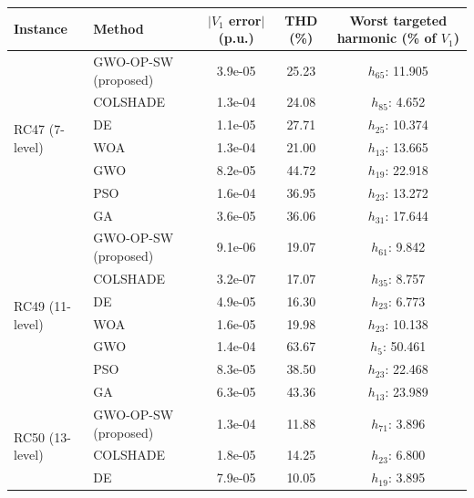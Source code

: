\begin{tabular}{llccc}
\hline
Instance & Method & $|V_1$ error$|$ (p.u.) & THD (\%) & Worst targeted harmonic (\% of $V_1$) \\
\hline
\multirow{7}{*}{RC47 (7-level)} & GWO-OP-SW (proposed) & 3.9e-05 & 25.23 & $h_{65}$: 11.905 \\
 & COLSHADE & 1.3e-04 & 24.08 & $h_{85}$: 4.652 \\
 & DE & 1.1e-05 & 27.71 & $h_{25}$: 10.374 \\
 & WOA & 1.3e-04 & 21.00 & $h_{13}$: 13.665 \\
 & GWO & 8.2e-05 & 44.72 & $h_{19}$: 22.918 \\
 & PSO & 1.6e-04 & 36.95 & $h_{23}$: 13.272 \\
 & GA & 3.6e-05 & 36.06 & $h_{31}$: 17.644 \\
\multirow{7}{*}{RC49 (11-level)} & GWO-OP-SW (proposed) & 9.1e-06 & 19.07 & $h_{61}$: 9.842 \\
 & COLSHADE & 3.2e-07 & 17.07 & $h_{35}$: 8.757 \\
 & DE & 4.9e-05 & 16.30 & $h_{23}$: 6.773 \\
 & WOA & 1.6e-05 & 19.98 & $h_{23}$: 10.138 \\
 & GWO & 1.4e-04 & 63.67 & $h_{5}$: 50.461 \\
 & PSO & 8.3e-05 & 38.50 & $h_{23}$: 22.468 \\
 & GA & 6.3e-05 & 43.36 & $h_{13}$: 23.989 \\
\multirow{3}{*}{RC50 (13-level)} & GWO-OP-SW (proposed) & 1.3e-04 & 11.88 & $h_{71}$: 3.896 \\
 & COLSHADE & 1.8e-05 & 14.25 & $h_{23}$: 6.800 \\
 & DE & 7.9e-05 & 10.05 & $h_{19}$: 3.895 \\
\hline
\end{tabular}
